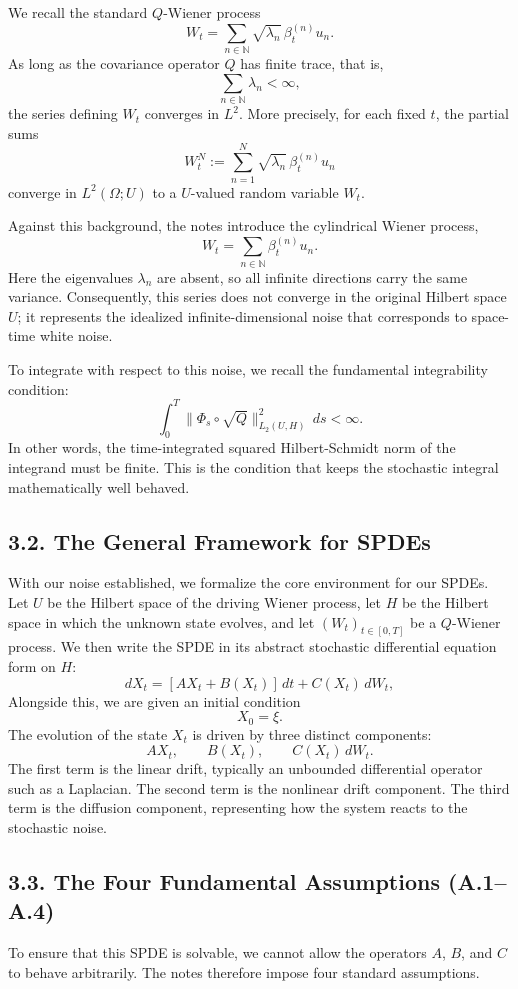 \documentclass[11pt]{article}
\theoremstyle{definition}
\theoremstyle{remark}
\begin{document}
We recall the standard \(Q\)-Wiener process
\[
W_t=\sum_{n\in\mathbb N}\sqrt{\lambda_n}\,\beta_t^{(n)}u_n.
\]
As long as the covariance operator \(Q\) has finite trace, that is,
\[
\sum_{n\in\mathbb N}\lambda_n<\infty,
\]
the series defining \(W_t\) converges in \(L^2\). More precisely, for each fixed \(t\), the partial sums
\[
W_t^N:=\sum_{n=1}^N \sqrt{\lambda_n}\,\beta_t^{(n)}u_n
\]
converge in \(L^2(\Omega;U)\) to a \(U\)-valued random variable \(W_t\).

Against this background, the notes introduce the cylindrical Wiener process,
\[
W_t=\sum_{n\in\mathbb N}\beta_t^{(n)}u_n.
\]
Here the eigenvalues \(\lambda_n\) are absent, so all infinite directions carry the same variance. Consequently, this series does not converge in the original Hilbert space \(U\); it represents the idealized infinite-dimensional noise that corresponds to space-time white noise.

To integrate with respect to this noise, we recall the fundamental integrability condition:
\[
\int_0^T \|\Phi_s\circ \sqrt Q\|_{L_2(U,H)}^2\,ds<\infty.
\]
In other words, the time-integrated squared Hilbert-Schmidt norm of the integrand must be finite.
This is the condition that keeps the stochastic integral mathematically well behaved.

\subsection*{3.2. The General Framework for SPDEs}
With our noise established, we formalize the core environment for our SPDEs. Let \(U\) be the Hilbert space of the driving Wiener process, let \(H\) be the Hilbert space in which the unknown state evolves, and let \((W_t)_{t\in[0,T]}\) be a \(Q\)-Wiener process. We then write the SPDE in its abstract stochastic differential equation form on \(H\):
\[
dX_t=[AX_t+B(X_t)]\,dt+C(X_t)\,dW_t,
\]
Alongside this, we are given an initial condition
\[
X_0=\xi.
\]
The evolution of the state \(X_t\) is driven by three distinct components:
\[
AX_t,
\qquad
B(X_t),
\qquad
C(X_t)\,dW_t.
\]
The first term is the linear drift, typically an unbounded differential operator such as a Laplacian. The second term is the nonlinear drift component. The third term is the diffusion component, representing how the system reacts to the stochastic noise.

\subsection*{3.3. The Four Fundamental Assumptions (A.1--A.4)}
To ensure that this SPDE is solvable, we cannot allow the operators \(A\), \(B\), and \(C\) to behave arbitrarily. The notes therefore impose four standard assumptions.
\end{document}
